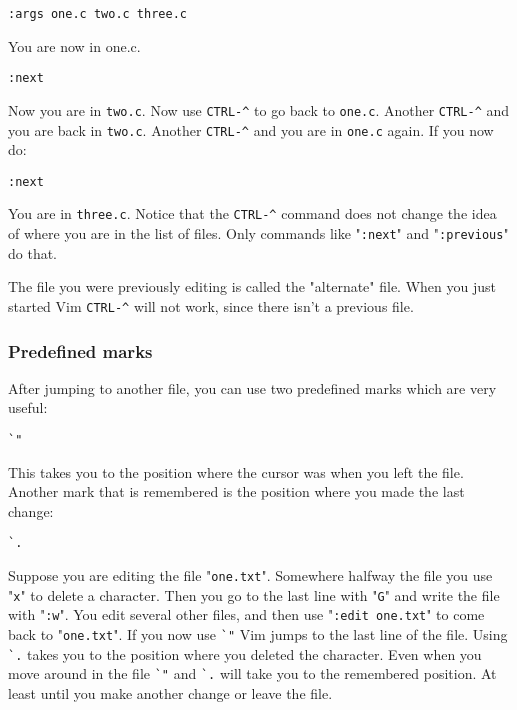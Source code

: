  \begin{Verbatim}[samepage=true]
 :args one.c two.c three.c
 \end{Verbatim}

You are now in one.c.

 \begin{Verbatim}[samepage=true]
 :next
 \end{Verbatim}

Now you are in \verb!two.c!.
Now use \verb!CTRL-^! to go back to \verb!one.c!.
Another \verb!CTRL-^! and you are back in \verb!two.c!.
Another \verb!CTRL-^! and you are in \verb!one.c! again.
If you now do:

 \begin{Verbatim}[samepage=true]
 :next
 \end{Verbatim}

You are in \verb!three.c!.
Notice that the \verb!CTRL-^! command does not change the idea of where you are in the list of files.
Only commands like "\verb!:next!" and "\verb!:previous!" do that.

The file you were previously editing is called the "alternate" file.
When you just started Vim \verb!CTRL-^! will not work, since there isn't a previous file.

\subsubsection{Predefined marks}
After jumping to another file, you can use two predefined marks which are very useful:

 \begin{Verbatim}[samepage=true]
 `"
 \end{Verbatim}

This takes you to the position where the cursor was when you left the file.
Another mark that is remembered is the position where you made the last change:

 \begin{Verbatim}[samepage=true]
 `.
 \end{Verbatim}

Suppose you are editing the file "\verb!one.txt!".
Somewhere halfway the file you use "\verb!x!" to delete a character.
Then you go to the last line with "\verb!G!" and write the file with "\verb!:w!".
You edit several other files, and then use "\verb!:edit one.txt!" to come back to "\verb!one.txt!".
If you now use \verb!`"! Vim jumps to the last line of the file.
Using \verb!`.! takes you to the position where you deleted the character.
Even when you move around in the file \verb!`"! and \verb!`.! will take you to the remembered position.
At least until you make another change or leave the file.

